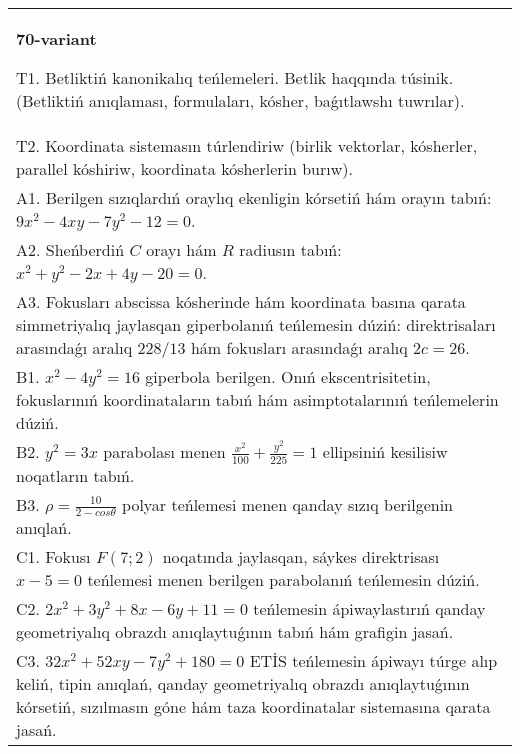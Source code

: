 \documentclass{article}
\begin{document}
\begin{tabular}{m{17cm}}
\textbf{70-variant}
\newline

T1. Betliktiń kanonikalıq teńlemeleri. Betlik haqqında túsinik. (Betliktiń anıqlaması, formulaları, kósher, baǵıtlawshı tuwrılar).\\

T2. Koordinata sistemasın túrlendiriw (birlik vektorlar, kósherler, parallel kóshiriw, koordinata kósherlerin burıw).\\

A1. Berilgen sızıqlardıń oraylıq ekenligin kórsetiń hám orayın tabıń: $9 x^{2}-4 xy-7 y^{2}-12=0$.\\

A2. Sheńberdiń $C$ orayı hám $R$ radiusın tabıń: $x^2+y^2-2 x+4 y-20=0$.\\

A3. Fokusları abscissa kósherinde hám koordinata basına qarata simmetriyalıq jaylasqan giperbolanıń teńlemesin dúziń: direktrisaları arasındaǵı aralıq $228/13$ hám fokusları arasındaǵı aralıq $2 c=26$.\\

B1. $x^{2} - 4y^{2} = 16$ giperbola berilgen. Onıń ekscentrisitetin, fokuslarınıń koordinataların tabıń hám asimptotalarınıń teńlemelerin dúziń.\\

B2. $y^{2} = 3x$ parabolası menen $\frac{x^{2}}{100} + \frac{y^{2}}{225} = 1$ ellipsiniń kesilisiw noqatların tabıń.  \\

B3. $\rho = \frac{10}{2 - cos\theta}$ polyar teńlemesi menen qanday sızıq berilgenin anıqlań.  \\

C1. Fokusı $F(7;2)$ noqatında jaylasqan, sáykes direktrisası $x - 5 = 0$ teńlemesi menen berilgen parabolanıń teńlemesin dúziń.  \\

C2. $2x^{2} + 3y^{2} + 8x - 6y + 11 = 0$ teńlemesin ápiwaylastırıń qanday geometriyalıq obrazdı anıqlaytuǵının tabıń hám grafigin jasań.\\

C3. $32x^{2} + 52xy - 7y^{2} + 180 = 0$ ETİS teńlemesin ápiwayı túrge alıp keliń, tipin anıqlań, qanday geometriyalıq obrazdı anıqlaytuǵının kórsetiń, sızılmasın góne hám taza koordinatalar sistemasına qarata jasań.  \\

\end{tabular}
\vspace{1cm}
\end{document}
